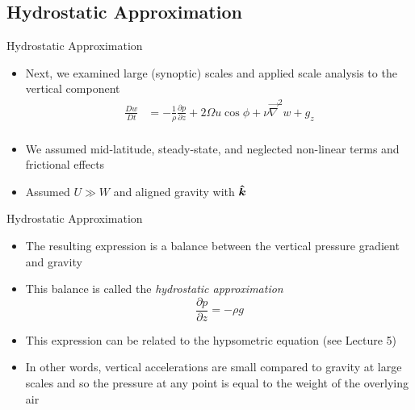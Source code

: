 \subsection{Hydrostatic Approximation}
\begin{frame}{Hydrostatic Approximation}

\begin{itemize}
	\item Next, we examined large (synoptic) scales and applied scale analysis to the vertical component
	\begin{align*}
	\frac{Dw}{Dt} &= -\frac{1}{\rho}	\frac{\partial p}{\partial z} + 2\Omega u \cos \phi + \nu \vec \nabla^2 w + g_z\\
	\end{align*}
	\item We assumed mid-latitude, steady-state, and neglected non-linear terms and frictional effects
	\item Assumed $U\gg W$ and aligned gravity with $\boldsymbol{\hat{k}}$
\end{itemize}
\end{frame}
\begin{frame}{Hydrostatic Approximation}

\begin{itemize}
	\item The resulting expression is a balance between the vertical pressure gradient and gravity
	\item This balance is called the \textit{hydrostatic approximation}
	$$\frac{\partial p}{\partial z} = -\rho g$$
	\item This expression can be related to the hypsometric equation (see Lecture 5)
	\item In other words, vertical accelerations are small compared to gravity at large scales and so the pressure at any point is equal to the weight of the overlying air
\end{itemize}
\end{frame}
